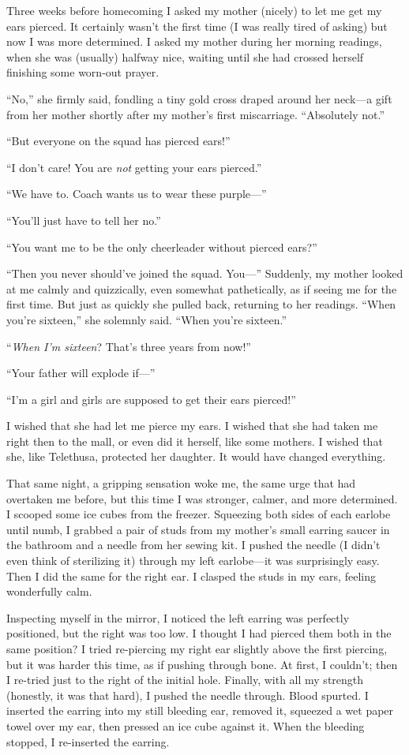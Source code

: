Three weeks before homecoming I asked my mother (nicely) to let me get
my ears pierced. It certainly wasn't the first time (I was really tired
of asking) but now I was more determined. I asked my mother during her
morning readings, when she was (usually) halfway nice, waiting until she
had crossed herself finishing some worn-out prayer.

``No,'' she firmly said, fondling a tiny gold cross draped around her
neck---a gift from her mother shortly after my mother's first
miscarriage. ``Absolutely not.''

``But everyone on the squad has pierced ears!''

``I don't care! You are \emph{not} getting your ears pierced.''

``We have to. Coach wants us to wear these purple---''

``You'll just have to tell her no.''

``You want me to be the only cheerleader without pierced ears?''

``Then you never should've joined the squad. You---'' Suddenly, my
mother looked at me calmly and quizzically, even somewhat pathetically,
as if seeing me for the first time. But just as quickly she pulled back,
returning to her readings. ``When you're sixteen,'' she solemnly said.
``When you're sixteen.''

``\emph{When I'm sixteen}? That's three years from now!''

``Your father will explode if---''

``I'm a girl and girls are supposed to get their ears pierced!''

I wished that she had let me pierce my ears. I wished that she had taken
me right then to the mall, or even did it herself, like some mothers. I
wished that she, like Telethusa, protected her daughter. It would have
changed everything.

That same night, a gripping sensation woke me, the same urge that had
overtaken me before, but this time I was stronger, calmer, and more
determined. I scooped some ice cubes from the freezer. Squeezing both
sides of each earlobe until numb, I grabbed a pair of studs from my
mother's small earring saucer in the bathroom and a needle from her
sewing kit. I pushed the needle (I didn't even think of sterilizing it)
through my left earlobe---it was surprisingly easy. Then I did the same
for the right ear. I clasped the studs in my ears, feeling wonderfully
calm.

Inspecting myself in the mirror, I noticed the left earring was
perfectly positioned, but the right was too low. I thought I had pierced
them both in the same position? I tried re-piercing my right ear
slightly above the first piercing, but it was harder this time, as if
pushing through bone. At first, I couldn't; then I re-tried just to the
right of the initial hole. Finally, with all my strength (honestly, it
was that hard), I pushed the needle through. Blood spurted. I inserted
the earring into my still bleeding ear, removed it, squeezed a wet paper
towel over my ear, then pressed an ice cube against it. When the
bleeding stopped, I re-inserted the earring.

